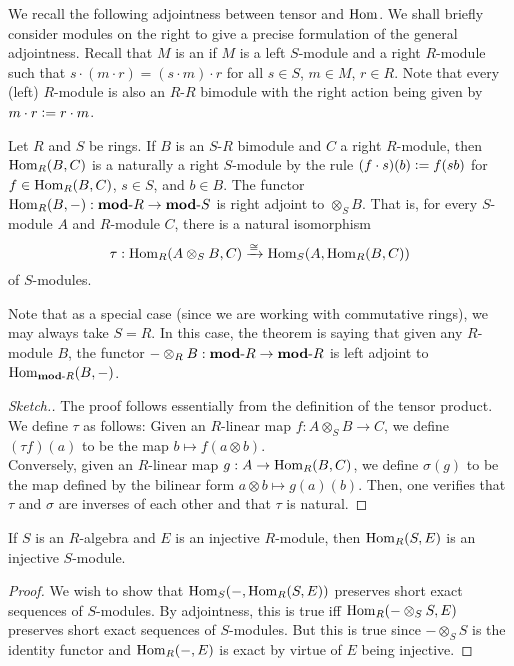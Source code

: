 We recall the following adjointness between tensor and $\operatorname{Hom}$. We shall briefly consider modules on the right to give a precise formulation of the general adjointness. Recall that $M$ is an  if $M$ is a left $S$-module and a right $R$-module such that $s \cdot (m \cdot r) = (s \cdot m) \cdot r$ for all $s \in S$, $m \in M$, $r \in R$. Note that every (left) $R$-module is also an $R$-$R$ bimodule with the right action being given by $m \cdot r \vcentcolon= r \cdot m$.

\begin{thm} \label{thm:tensor-hom-adjointness}
	Let $R$ and $S$ be rings. If $B$ is an $S$-$R$ bimodule and $C$ a right $R$-module, then $\operatorname{Hom}_{R}(B, C)$ is a naturally a right $S$-module by the rule $(f \cdot s)(b) \vcentcolon= f(sb)$ for $f \in \operatorname{Hom}_{R}(B, C)$, $s \in S$, and $b \in B$. \newline
	The functor $\operatorname{Hom}_{R}(B, -) : \mathbf{mod}\text{-}R \to \mathbf{mod}\text{-}S$ is right adjoint to $\otimes_{S} B$. \newline
	That is, for every $S$-module $A$ and $R$-module $C$, there is a natural isomorphism
	\begin{equation*} 
		\tau : \operatorname{Hom}_{R}(A \otimes_{S} B, C) \xrightarrow{\cong} \operatorname{Hom}_{S}(A, \operatorname{Hom}_{R}(B, C))
	\end{equation*}
	of $S$-modules.
\end{thm}
\begin{rem}
	Note that as a special case (since we are working with commutative rings), we may always take $S = R$. In this case, the theorem is saying that given any $R$-module $B$, the functor $- \otimes_{R} B : \mathbf{mod}\text{-}R \to \mathbf{mod}\text{-}R$ is left adjoint to $\operatorname{Hom}_{\mathbf{mod}\text{-}R}(B, -)$.
\end{rem}
\begin{proof}[Sketch.] 
	The proof follows essentially from the definition of the tensor product. We define $\tau$ as follows: Given an $R$-linear map $f : A \otimes_{S} B \to C$, we define $(\tau f)(a)$ to be the map $b \mapsto f(a \otimes b)$. \\
	Conversely, given an $R$-linear map $g : A \to \operatorname{Hom}_{R}(B, C)$, we define $\sigma(g)$ to be the map defined by the bilinear form $a \otimes b \mapsto g(a)(b)$. \newline
	Then, one verifies that $\tau$ and $\sigma$ are inverses of each other and that $\tau$ is natural.
\end{proof}

\begin{cor} \label{cor:base-change-injective}
	If $S$ is an $R$-algebra and $E$ is an injective $R$-module, then $\operatorname{Hom}_{R}(S, E)$ is an injective $S$-module.
\end{cor}
\begin{proof} 
	We wish to show that $\operatorname{Hom}_{S}(-, \operatorname{Hom}_{R}(S, E))$ preserves short exact sequences of $S$-modules. By adjointness, this is true iff $\operatorname{Hom}_{R}(- \otimes_{S} S, E)$ preserves short exact sequences of $S$-modules. But this is true since $- \otimes_{S} S$ is the identity functor and $\operatorname{Hom}_{R}(-, E)$ is exact by virtue of $E$ being injective.
\end{proof}

